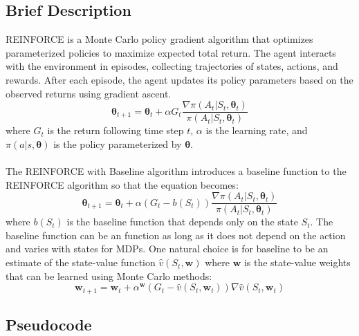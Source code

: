 \documentclass{article}
\begin{document}
\subsection{Brief Description}
REINFORCE is a Monte Carlo policy gradient algorithm that optimizes parameterized policies to maximize expected total return. 
The agent interacts with the environment in episodes, collecting trajectories of states, actions, and rewards. 
After each episode, the agent updates its policy parameters based on the observed returns using gradient ascent.
$$\bm{\theta}_{t+1} = \bm{\theta}_t + \alpha G_t \frac{\nabla \pi(A_t|S_t, \bm{\theta}_t)}{\pi(A_t|S_t, \bm{\theta}_t)}$$
where $G_t$ is the return following time step $t$, $\alpha$ is the learning rate, and $\pi(a|s,\bm{\theta})$ is the policy parameterized by $\bm{\theta}$.
\\
\\
The REINFORCE with Baseline algorithm introduces a baseline function to the REINFORCE algorithm so that the equation becomes:
$$\bm{\theta}_{t+1} = \bm{\theta}_t + \alpha (G_t - b(S_t)) \frac{\nabla \pi(A_t|S_t, \bm{\theta}_t)}{\pi(A_t|S_t, \bm{\theta}_t)}$$
where $b(S_t)$ is the baseline function that depends only on the state $S_t$.
The baseline function can be an function as long as it does not depend on the action and varies with states for MDPs. 
One natural choice is for baseline to be an estimate of the state-value function $\hat{v}(S_t, \bm{w})$ where $\bm{w}$ is the state-value weights that can be learned using Monte Carlo methods:
$$\bm{w}_{t+1} = \bm{w}_t + \alpha^{\bm{w}} (G_t - \hat{v}(S_t, \bm{w}_t)) \nabla \hat{v}(S_t, \bm{w}_t)$$

\subsection{Pseudocode}
\end{document}
